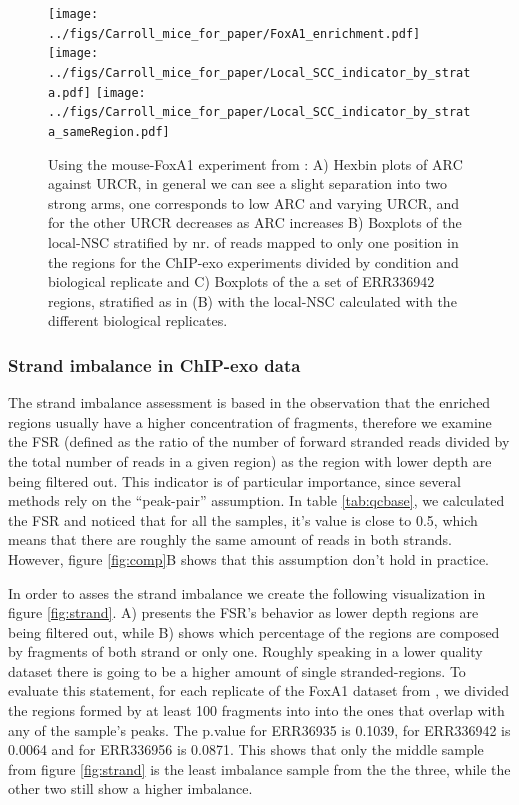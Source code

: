 \documentclass{bmcart}\usepackage[]{graphicx}\usepackage[]{color}
\begin{document}
\begin{figure}[h!]
  \centering
  \texttt{[image: ../figs/Carroll\_mice\_for\_paper/FoxA1\_enrichment.pdf]}
  \texttt{[image: ../figs/Carroll\_mice\_for\_paper/Local\_SCC\_indicator\_by\_strata.pdf]}
  \texttt{[image: ../figs/Carroll\_mice\_for\_paper/Local\_SCC\_indicator\_by\_strata\_sameRegion.pdf]}
  \caption{Using the mouse-FoxA1 experiment from \cite{exoillumina}:
    A) Hexbin plots of $\mbox{ARC}$ against $\mbox{URCR}$, in general
    we can see a slight separation into two strong arms, one
    corresponds to low $\mbox{ARC}$ and varying $\mbox{URCR}$, and for
    the other $\mbox{URCR}$ decreases as $\mbox{ARC}$ increases B)
    Boxplots of the $\mbox{local-NSC}$ stratified by nr. of reads
    mapped to only one position in the regions for the ChIP-exo
    experiments divided by condition and biological replicate and C)
    Boxplots of the a set of ERR336942 regions, stratified as in (B)
    with the $\mbox{local-NSC}$ calculated with the different
    biological replicates.}
  \label{fig:enrich}
\end{figure}


\subsubsection{Strand imbalance in ChIP-exo data}
\label{sec:strand_imbalance}

The strand imbalance assessment is based in the observation that the
enriched regions usually have a higher concentration of fragments,
therefore we examine the FSR (defined as the ratio of the number of
forward stranded reads divided by the total number of reads in a given
region) as the region with lower depth are being filtered out. This
indicator is of particular importance, since several methods rely on
the ``peak-pair'' assumption. In table \ref{tab:qcbase}, we calculated
the FSR and noticed that for all the samples, it's value is close to
0.5, which means that there are roughly the same amount of reads in
both strands. However, figure \ref{fig:comp}B shows that this
assumption don't hold in practice. 



In order to asses the strand imbalance we create the following
visualization in figure \ref{fig:strand}. A) presents the FSR's
behavior as lower depth regions are being filtered out, while B) shows
which percentage of the regions are composed by fragments of both
strand or only one. Roughly speaking in a lower quality dataset there
is going to be a higher amount of single stranded-regions. To evaluate
this statement, for each replicate of the FoxA1 dataset from
\cite{exoillumina}, we divided the regions formed by at least
100 fragments into into the ones that overlap with any of the
sample's peaks. The p.value for ERR36935 is 0.1039, for
ERR336942 is 0.0064 and for ERR336956 is
0.0871. This shows that only the middle sample from figure
\ref{fig:strand} is the least imbalance sample from the the three,
while the other two still show a higher imbalance.
\end{document}
